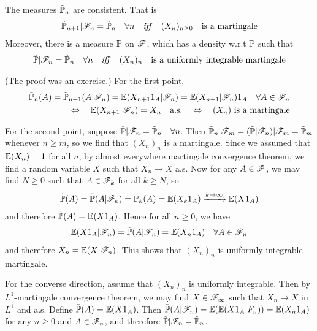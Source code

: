 \documentclass[12pt,a4paper]{report}
\newenvironment{proof}
{\begin{changemargin}{1cm}{0.5cm} 
	}%
	{\end{changemargin}
}
\begin{document}
 The measures $\tilde{\mathbb{P}}_n$ are consistent. That is
\begin{align*}
\tilde{\mathbb{P}}_{n+1} | \mathscr{F}_n = \tilde{\mathbb{P}}_n \quad \forall n \quad \text{\emph{iff}} \quad (X_n)_{n\geq 0} \quad \text{is a martingale}
\end{align*}
Moreover, there is a measure $\tilde{\mathbb{P}}$ on $\mathscr{F}$, which has a density w.r.t $\mathbb{P}$ such that
\begin{align*}
\tilde{\mathbb{P}} |\mathscr{F}_n = \tilde{\mathbb{P}}_n \quad \forall n \quad \text{\emph{iff}} \quad (X_n)_n \quad \text{is a uniformly integrable martingale}
\end{align*}
\begin{proof}
\pf (The proof was an exercise.)
For the first point,
\begin{align*}
\tilde{\mathbb{P}}_n (A) = \tilde{\mathbb{P}}_{n+1}(A |\mathscr{F}_n) = \mathbb{E}(X_{n+1} 1_A |\mathscr{F}_n) = \mathbb{E}(X_{n+1}|\mathscr{F}_n) 1_A  \quad \forall A \in \mathscr{F}_n \\
\Leftrightarrow \quad \mathbb{E}(X_{n+1} |\mathscr{F}_n) = X_n \quad \text{a.s.} \quad \Leftrightarrow \quad (X_n) \text{ is a martingale}
\end{align*}

\quad For the second point, suppose $\tilde{\mathbb{P}} |\mathscr{F}_n = \tilde{\mathbb{P}}_n \quad \forall n$. Then $\tilde{\mathbb{P}}_n |\mathscr{F}_m  =(\tilde{\mathbb{P}} | \mathscr{F}_n) | \mathscr{F}_m = \tilde{\mathbb{P}}_m$ whenever $n\geq m$, so we find that $(X_n)_n$ is a martingale. Since we assumed that $\mathbb{E}(X_n)=1$ for all $n$, by almost everywhere martingale convergence theorem, we find a random variable $X$ such that $X_n \rightarrow X$ a.s. Now for any $A \in \mathscr{F}$, we may find $N \geq 0$ such that $A\in \mathscr{F}_k$ for all $k\geq N$, so
\begin{align*}
\tilde{\mathbb{P}}(A) = \tilde{\mathbb{P}}(A |\mathscr{F}_k) = \tilde{\mathbb{P}}_k (A) = \mathbb{E}(X_k 1_A) \xrightarrow{k\rightarrow \infty} \mathbb{E}(X 1_A)
\end{align*}
and therefore $\tilde{\mathbb{P}}(A) = \mathbb{E}(X 1_A)$. Hence for all $n \geq 0$, we have
\begin{align*}
\mathbb{E}(X 1_A|\mathscr{F}_n) = \tilde{\mathbb{P}}(A |\mathscr{F}_n) = \mathbb{E}(X_n 1_A) \quad \forall A \in \mathscr{F}_n
\end{align*} 
and therefore $X_n = \mathbb{E}(X|\mathscr{F}_n)$. This shows that $(X_n)_n$ is uniformly integrable martingale.

\quad For the converse direction, assume that $(X_n)_n$ is uniformly integrable. Then by $L^1$-martingale convergence theorem, we may find $X \in \mathscr{F}_{\infty}$ such that $X_n \rightarrow X$ in $L^1$ and a.s. Define $\tilde{\mathbb{P}}(A) = \mathbb{E}(X 1_A)$. Then $\tilde{\mathbb{P}}(A |\mathscr{F}_n) = \mathbb{E}(\mathbb{E}(X 1_A |F_n)) = \mathbb{E}(X_n 1_A)$ for any $n\geq 0$ and $A\in \mathscr{F}_n$, and therefore $\tilde{\mathbb{P}} | \mathscr{F}_n = \tilde{\mathbb{P}}_n$. 

\eop 
\end{proof}
\s
\end{document}
